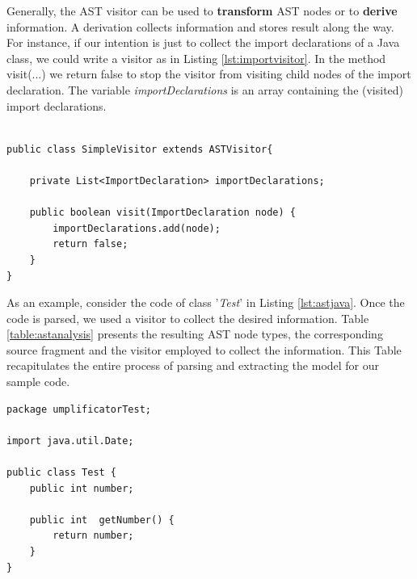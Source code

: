 Generally, the AST visitor can be used to \textbf{transform} AST nodes or to \textbf{derive} information. A derivation collects information and stores result along the way. For instance, if our intention is just to collect the import declarations of a Java class, we could write a visitor as in Listing \ref{lst:importvisitor}. In the method visit(...) we return false to stop the visitor from visiting child nodes of the import declaration. The variable \textit{importDeclarations} is an array containing the (visited) import declarations. 

\begin{lstlisting}[style=java, caption=A visitor for Import declarations in Java source code, label=lst:importvisitor]

public class SimpleVisitor extends ASTVisitor{

	private List<ImportDeclaration> importDeclarations;

	public boolean visit(ImportDeclaration node) {
	    importDeclarations.add(node);
	    return false;
	}
}
\end{lstlisting}

As an example, consider the code of class '\textit{Test}' in Listing \ref{lst:astjava}. Once the code is parsed, we used a visitor to collect the desired information. Table \ref{table:astanalysis} presents the resulting AST node types, the corresponding source fragment and the visitor employed to collect the information. This Table recapitulates the entire process of parsing and extracting the model for our sample code. 


\begin{lstlisting}[style=java, caption=Test.java, label=lst:astjava]
package umplificatorTest;

import java.util.Date;

public class Test {
	public int number;
	
	public int  getNumber() {
		return number;
	}
}
\end{lstlisting}

